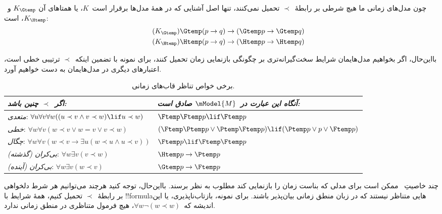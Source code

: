 \documentclass[../../../include/open-logic-section]{subfiles}
\begin{document}


چون مدل‌های زمانی ما هیچ شرطی بر رابطهٔ~$\prec$ تحمیل نمی‌کنند، تنها
اصل آشنایی که در همهٔ مدل‌ها برقرار است~$K$، یا همتاهای آن
$K_{\Gtemp}$ و~$K_{\Htemp}$، است:
\begin{align*}
\tag{$K_{\Gtemp}$}  \Gtemp (p \to q) & \to (\Gtemp p \to \Gtemp q)\\
\tag{$K_{\Htemp}$}  \Htemp (p \to q) & \to (\Htemp p \to \Htemp q)
\end{align*}

بااین‌حال، اگر بخواهیم مدل‌هایمان شرایط سخت‌گیرانه‌تری بر چگونگی
بازنمایی زمان تحمیل کنند، برای نمونه با تضمین اینکه~$\prec$ ترتیبی
خطی است، اعتبارهای دیگری در مدل‌هایمان به دست خواهیم آورد.

\begin{table}[t]
  \begin{tabular}{| p{} || p{} |}
    \hline
    {\emph{اگر~$\prec$ چنین باشد:}} & {\emph{آنگاه این عبارت
      در~$\mModel{M}$ صادق است:}} \\
    \hline \hline
    \emph{متعدی}: \newline
    $\forall u \forall v \forall w ((u \prec v \land v \prec w) \lif u \prec w)$ & 
    $\Ftemp \Ftemp p \lif \Ftemp p$  \\
    \hline 
    \emph{خطی}: \newline
    $\forall w \forall v (w \prec v \lor w = v \lor v \prec w)$ &  
    $(\Ftemp \Ptemp p \lor \Ptemp \Ftemp p) \lif (\Ptemp p \lor p \lor \Ftemp p)$\\
    \hline
    \emph{چگال}: \newline
    $\forall w \forall v (w \prec v \to \exists u(w \prec u \land u \prec v))$ &  
    $\Ftemp p \lif \Ftemp \Ftemp p$ \\
    \hline
    \emph{بی‌کران (گذشته)}: \newline
    $\forall w \exists v( v \prec w)$ &  
    $\Htemp p \to \Ptemp p$ \\
    \hline
    \emph{بی‌کران (آینده)}: \newline
    $\forall w \exists v( w \prec v)$ &  
    $\Gtemp p \to \Ftemp p$ \\
    \hline
  \end{tabular}
  \caption{برخی خواص تناظر قاب‌های زمانی.}
\end{table} 

چند خاصیتِ~ ممکن است برای مدلی که بناست زمان
را بازنمایی کند مطلوب به نظر برسند. بااین‌حال، توجه کنید هرچند می‌توانیم
هر شرط دلخواهی بر رابطهٔ~$\prec$ تحمیل کنیم، همهٔ شرایط با
!!{formula}هایی متناظر نیستند که در زبان منطق زمانی بیان‌پذیر باشند.
برای نمونه، بازتاب‌ناپذیری، یا این اندیشه که~$\forall w \lnot (w
\prec w)$، هیچ فرمول متناظری در منطق زمانی ندارد.
\end{document}
